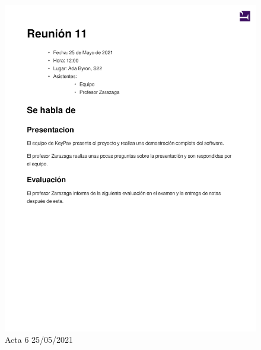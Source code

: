 \documentclass{article}
\begin{document}
\begin{figure}[H]
   \includegraphics[width=.8\textwidth]{../../actas_reuniones/2021.25.05_6_Actas.pdf}
   \caption{Acta 6 25/05/2021}
\end{figure}
\end{document}

